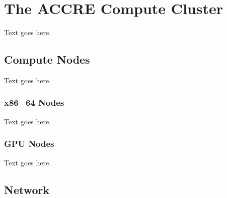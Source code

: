 
%
%

\section{The ACCRE Compute Cluster}
\label{sec:accre}



Text goes here.




\subsection{Compute Nodes}
\label{subsec:accre--nodes}


Text goes here.



\subsubsection{x86\_64 Nodes}
\label{subsubsec:accre--nodes--x86_64}


Text goes here.



\subsubsection{GPU Nodes}
\label{subsubsec:accre--nodes--gpu}


Text goes here.




\subsection{Network}
\label{subsec:accre--network}


